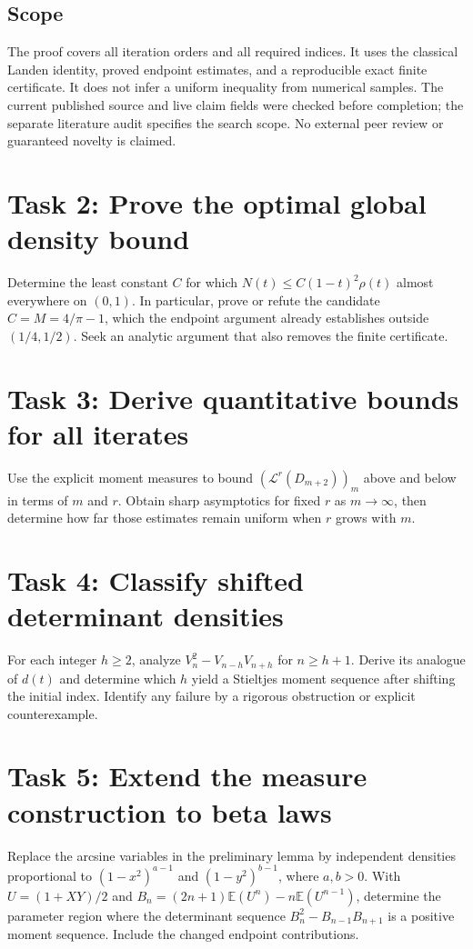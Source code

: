 \documentclass[11pt]{article}
\newcommand{\E}{\mathbb E}
\begin{document}
\subsection*{Scope}
The proof covers all iteration orders and all required indices.
It uses the classical Landen identity, proved endpoint estimates,
and a reproducible exact finite certificate. It does not infer a
uniform inequality from numerical samples. The current published
source and live claim fields were checked before completion; the
separate literature audit specifies the search scope. No external
peer review or guaranteed novelty is claimed.

\section*{Task 2: Prove the optimal global density bound}
Determine the least constant $C$ for which
$N(t)\leq C(1-t)^2\rho(t)$ almost everywhere on $(0,1)$.
In particular, prove or refute the candidate $C=M=4/\pi-1$,
which the endpoint argument already establishes outside $(1/4,1/2)$.
Seek an analytic argument that also removes the finite certificate.

\section*{Task 3: Derive quantitative bounds for all iterates}
Use the explicit moment measures to bound
$(\mathcal L^r(D_{m+2}))_m$ above and below in terms of $m$ and $r$.
Obtain sharp asymptotics for fixed $r$ as $m\to\infty$, then determine
how far those estimates remain uniform when $r$ grows with $m$.

\section*{Task 4: Classify shifted determinant densities}
For each integer $h\geq2$, analyze
$V_n^2-V_{n-h}V_{n+h}$ for $n\geq h+1$.
Derive its analogue of $d(t)$ and determine which $h$ yield a
Stieltjes moment sequence after shifting the initial index.
Identify any failure by a rigorous obstruction or explicit counterexample.

\section*{Task 5: Extend the measure construction to beta laws}
Replace the arcsine variables in the preliminary lemma by independent
densities proportional to $(1-x^2)^{a-1}$ and $(1-y^2)^{b-1}$,
where $a,b>0$. With $U=(1+XY)/2$ and
$B_n=(2n+1)\E(U^n)-n\E(U^{n-1})$, determine the parameter region
where the determinant sequence $B_n^2-B_{n-1}B_{n+1}$ is a positive
moment sequence. Include the changed endpoint contributions.
\end{document}
